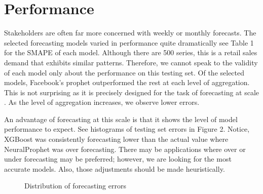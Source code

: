 \documentclass[16pt,twocolumn,letterpaper,titlepage]{article}
\begin{document}
\section{Performance}
Stakeholders are often far more concerned with weekly or monthly forecasts. The selected forecasting models varied in performance quite dramatically see Table 1 for the SMAPE of each model. Although there are 500 series, this is a retail sales demand that exhibits similar patterns. Therefore, we cannot speak to the validity of each model only about the performance on this testing set. Of the selected models, Facebook's prophet outperformed the rest at each level of aggregation. This is not surprising as it is precisely designed for the task of forecasting at scale \cite{taylor2018forecasting}. As the level of aggregation increases, we observe lower errors. 

An advantage of forecasting at this scale is that it shows the level of model performance to expect. See histograms of testing set errors in Figure 2. Notice, XGBoost was consistently forecasting lower than the actual value where  NeuralProphet was over forecasting. There may be applications where over or under forecasting may be preferred; however, we are looking for the most accurate models. Also, those adjustments should be made heuristically. 


\begin{figure}[!htb]
	\caption{\label{fig:my-label} Distribution of forecasting errors}
\end{figure}
\end{document}
